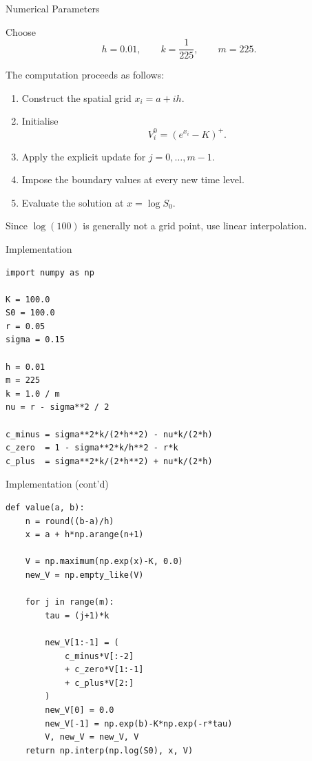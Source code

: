 \documentclass{beamer}
\begin{document}
\begin{frame}{Numerical Parameters}

Choose
\[
h=0.01,
\qquad
k=\frac{1}{225},
\qquad
m=225.
\]

The computation proceeds as follows:

\begin{enumerate}
    \item Construct the spatial grid \(x_i=a+ih\).
    \item Initialise
    \[
    V_i^0=(e^{x_i}-K)^+.
    \]
    \item Apply the explicit update for \(j=0,\ldots,m-1\).
    \item Impose the boundary values at every new time level.
    \item Evaluate the solution at \(x=\log S_0\).
\end{enumerate}

Since \(\log(100)\) is generally not a grid point,
use linear interpolation.

\end{frame}


\begin{frame}[fragile]{Implementation}

\begin{lstlisting}
import numpy as np

K = 100.0
S0 = 100.0
r = 0.05
sigma = 0.15

h = 0.01
m = 225
k = 1.0 / m
nu = r - sigma**2 / 2

c_minus = sigma**2*k/(2*h**2) - nu*k/(2*h)
c_zero  = 1 - sigma**2*k/h**2 - r*k
c_plus  = sigma**2*k/(2*h**2) + nu*k/(2*h)
\end{lstlisting}

\end{frame}

\begin{frame}[fragile]{Implementation (cont'd)}
\begin{lstlisting}
def value(a, b):
    n = round((b-a)/h)
    x = a + h*np.arange(n+1)

    V = np.maximum(np.exp(x)-K, 0.0)
    new_V = np.empty_like(V)

    for j in range(m):
        tau = (j+1)*k

        new_V[1:-1] = (
            c_minus*V[:-2]
            + c_zero*V[1:-1]
            + c_plus*V[2:]
        )
        new_V[0] = 0.0
        new_V[-1] = np.exp(b)-K*np.exp(-r*tau)
        V, new_V = new_V, V
    return np.interp(np.log(S0), x, V)
\end{lstlisting}
    
\end{frame}
\end{document}
